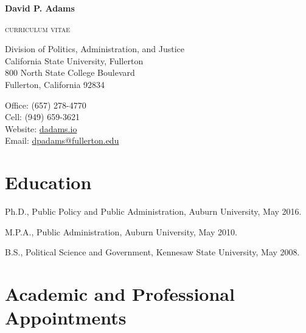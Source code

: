 \documentclass[12pt,letterpaper]{article}
\def\name{David P. Adams}
\renewenvironment{itemize}{
  \begin{list}{}{
    \setlength{\leftmargin}{1.5em}
    \setlength{\itemsep}{0.25em}
    \setlength{\parskip}{0pt}
    \setlength{\parsep}{0.25em}
  }
}{
  \end{list}
}
\begin{document}
    
    
\centerline{\huge \bf \name}
\smallskip
\centerline{\small{\textsc{curriculum vitae}}}

\bigskip

\noindent

\begin{minipage}[t]{0.55\textwidth}
    Division of Politics, Administration, and Justice \\
    California State University, Fullerton \\
    800 North State College Boulevard  \\
    Fullerton, California 92834
\end{minipage}
\hfill
\begin{minipage}[t]{0.4\textwidth}
    Office: \hspace{6em}(657) 278-4770 \\
    Cell: \hspace{6.5em} (949) 659-3621 \\
    Website: \hspace{7.0em}\href{https://dadams.io}{dadams.io} \\
    Email: \hspace{2.2em}\href{mailto:dpadams@fullerton.edu}{dpadams@fullerton.edu}
\end{minipage}


  \section*{Education}

  \begin{itemize}\leftmargin=2pt\itemindent=-15pt
  \item Ph.D., Public Policy and Public Administration, Auburn University, May 2016. \vspace{0.2cm}
  \item M.P.A., Public Administration, Auburn University, May 2010. \vspace{0.2cm}
  \item B.S., Political Science and Government, Kennesaw State University, May 2008.
  \end{itemize}
  
  \section*{Academic and Professional Appointments}
\end{document}
